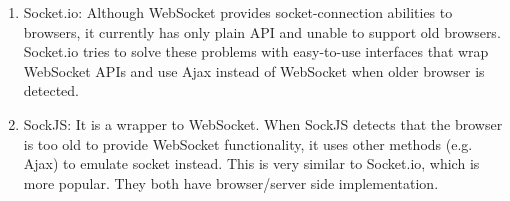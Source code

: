 \begin{enumerate}
\item Socket.io\cite{socketio}:
  Although WebSocket provides socket-connection abilities to browsers, it currently has only plain API and unable to support old browsers. Socket.io tries to solve these problems with easy-to-use interfaces that wrap WebSocket APIs and use Ajax instead of WebSocket when older browser is detected.

\item SockJS\cite{sockjs}:
  It is a wrapper to WebSocket. When SockJS detects that the browser is too old to provide WebSocket functionality, it uses other methods (e.g. Ajax) to emulate socket instead. This is very similar to Socket.io, which is more popular. They both have browser/server side implementation.

\end{enumerate}
